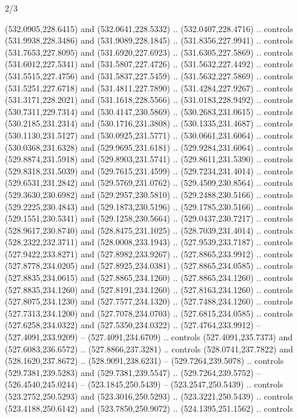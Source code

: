 \begin{flagdescription}{2/3}
\begin{scope}[xshift=0.5\flaglength,yshift=0.5\flagwidth,scale=\flagwidth/495.65]
\begin{scope}[y=0.8pt, x=0.8pt, yscale=-1,shift={(-463.76,-309.78)}]
  (532.0905,228.6415) and (532.0641,228.5332) .. (532.0407,228.4716) .. controls
  (531.9938,228.3486) and (531.9089,228.1845) .. (531.8356,227.9941) .. controls
  (531.7653,227.8095) and (531.6920,227.6923) .. (531.6305,227.5869) .. controls
  (531.6012,227.5341) and (531.5807,227.4726) .. (531.5632,227.4492) .. controls
  (531.5515,227.4756) and (531.5837,227.5459) .. (531.5632,227.5869) .. controls
  (531.5251,227.6718) and (531.4811,227.7890) .. (531.4284,227.9267) .. controls
  (531.3171,228.2021) and (531.1618,228.5566) .. (531.0183,228.9492) .. controls
  (530.7311,229.7314) and (530.4147,230.5869) .. (530.2683,231.0615) .. controls
  (530.2185,231.2314) and (530.1716,231.3808) .. (530.1335,231.4687) .. controls
  (530.1130,231.5127) and (530.0925,231.5771) .. (530.0661,231.6064) .. controls
  (530.0368,231.6328) and (529.9695,231.6181) .. (529.9284,231.6064) .. controls
  (529.8874,231.5918) and (529.8903,231.5741) .. (529.8611,231.5390) .. controls
  (529.8318,231.5039) and (529.7615,231.4599) .. (529.7234,231.4014) .. controls
  (529.6531,231.2842) and (529.5769,231.0762) .. (529.4509,230.8564) .. controls
  (529.3630,230.6982) and (529.2957,230.5810) .. (529.2488,230.5166) .. controls
  (529.2225,230.4843) and (529.1873,230.5196) .. (529.1785,230.5166) .. controls
  (529.1551,230.5341) and (529.1258,230.5664) .. (529.0437,230.7217) .. controls
  (528.9617,230.8740) and (528.8475,231.1025) .. (528.7039,231.4014) .. controls
  (528.2322,232.3711) and (528.0008,233.1943) .. (527.9539,233.7187) .. controls
  (527.9422,233.8271) and (527.8982,233.9267) .. (527.8865,233.9912) .. controls
  (527.8778,234.0205) and (527.8925,234.0381) .. (527.8865,234.0585) .. controls
  (527.8835,234.0615) and (527.8865,234.1260) .. (527.8865,234.1260) .. controls
  (527.8835,234.1260) and (527.8191,234.1260) .. (527.8163,234.1260) .. controls
  (527.8075,234.1230) and (527.7577,234.1320) .. (527.7488,234.1260) .. controls
  (527.7313,234.1200) and (527.7078,234.0703) .. (527.6815,234.0585) .. controls
  (527.6258,234.0322) and (527.5350,234.0322) .. (527.4764,233.9912) --
  (527.4091,233.9209) -- (527.4091,234.6709) .. controls (527.4091,235.7373) and
  (527.6083,236.6572) .. (527.8866,237.3281) .. controls (528.0741,237.7822) and
  (528.1620,237.8672) .. (528.9091,238.6231) -- (529.7264,239.5078) .. controls
  (529.7381,239.5283) and (529.7381,239.5547) .. (529.7264,239.5752) --
  (526.4540,245.0244) -- (523.1845,250.5439) -- (523.2547,250.5439) .. controls
  (523.2752,250.5293) and (523.3016,250.5293) .. (523.3221,250.5439) .. controls
  (523.4188,250.6142) and (523.7850,250.9072) .. (524.1395,251.1562) .. controls

\end{scope}
\end{scope}
\end{flagdescription}
